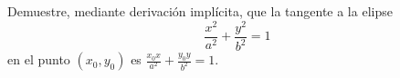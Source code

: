 \item Demuestre, mediante derivación implícita, que la tangente a la elipse
$$\frac{x^2}{a^2} + \frac{y^2}{b^2} = 1$$
en el punto $(x_0, y_0)$ es $\displaystyle \frac{x_0 x}{a^2} + \frac{y_0 y}{b^2} = 1$.
